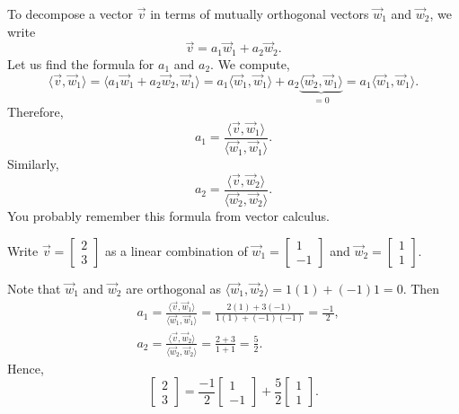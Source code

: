 To decompose a vector $\vec{v}$ in terms of mutually orthogonal
vectors $\vec{w}_1$ and $\vec{w}_2$, we write
\begin{equation*}
\vec{v} = a_1 \vec{w}_1  + a_2 \vec{w}_2 .
\end{equation*}
Let us find the formula for $a_1$ and $a_2$.  We compute,
\begin{equation*}
\langle \vec{v} , \vec{w}_1 \rangle
=
\langle a_1 \vec{w}_1  + a_2 \vec{w}_2 , \vec{w}_1 \rangle
=
a_1 \langle \vec{w}_1 , \vec{w}_1 \rangle
+
a_2 \underbrace{\langle \vec{w}_2 , \vec{w}_1 \rangle}_{=0}
=
a_1 \langle \vec{w}_1 , \vec{w}_1 \rangle .
\end{equation*}
Therefore,
\begin{equation*}
a_1 = 
\frac{\langle \vec{v} , \vec{w}_1 \rangle}{
\langle \vec{w}_1 , \vec{w}_1 \rangle} .
\end{equation*}
Similarly,
\begin{equation*}
a_2 = 
\frac{\langle \vec{v} , \vec{w}_2 \rangle}{
\langle \vec{w}_2 , \vec{w}_2 \rangle} .
\end{equation*}
You probably remember this formula from vector calculus.

\begin{example}
Write
$\vec{v} = \left[ \begin{smallmatrix} 2 \\ 3 \end{smallmatrix} \right]$
as a linear combination of 
$\vec{w}_1 = \left[ \begin{smallmatrix} 1 \\ -1 \end{smallmatrix} \right]$
and
$\vec{w}_2 = \left[ \begin{smallmatrix} 1 \\ 1 \end{smallmatrix} \right]$.

Note that $\vec{w}_1$ and $\vec{w}_2$ are orthogonal
as $\langle \vec{w}_1 , \vec{w}_2 \rangle = 1(1) + (-1)1 = 0$.
Then
\begin{align*}
& a_1 = 
\frac{\langle \vec{v} , \vec{w}_1 \rangle}{
\langle \vec{w}_1 , \vec{w}_1 \rangle}
=
\frac{2(1) + 3(-1)}{1(1) + (-1)(-1)} = \frac{-1}{2} ,
\\
& a_2 = 
\frac{\langle \vec{v} , \vec{w}_2 \rangle}{
\langle \vec{w}_2 , \vec{w}_2 \rangle}
=
\frac{2 + 3}{1 + 1} = \frac{5}{2} .
\end{align*}
Hence,
\begin{equation*}
\begin{bmatrix} 2 \\ 3 \end{bmatrix}
=
\frac{-1}{2}
\begin{bmatrix} 1 \\ -1 \end{bmatrix}
+
\frac{5}{2}
\begin{bmatrix} 1 \\ 1 \end{bmatrix} .
\end{equation*}
\end{example}

